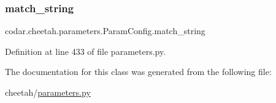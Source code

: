 \subsubsection{\texorpdfstring{match\+\_\+string}{match\_string}}
{\footnotesize\ttfamily codar.\+cheetah.\+parameters.\+Param\+Config.\+match\+\_\+string}



Definition at line 433 of file parameters.\+py.



The documentation for this class was generated from the following file\+:\begin{DoxyCompactItemize}
\item 
cheetah/\hyperlink{parameters_8py}{parameters.\+py}\end{DoxyCompactItemize}
